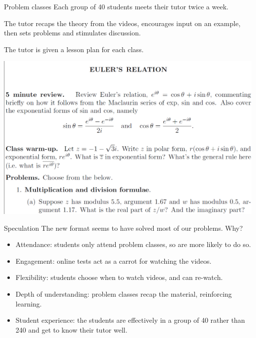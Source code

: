 \documentclass[12pt,envcountsect]{beamer}
\theoremstyle{plain}
\theoremstyle{definition}
\begin{document}
\begin{frame}{Problem classes}
Each group of 40 students meets their tutor twice a week. \pause

The tutor recaps the theory from the videos, \pause encourages input on an example, \pause then sets problems and stimulates discussion.\pause

The tutor is given a lesson plan for each class.
\end{frame}

\begin{frame}
\includegraphics[width=1\textwidth]{worksheet.jpg}
\end{frame}

\begin{frame}{Speculation}
The new format seems to have solved most of our problems. \pause Why?\pause
\begin{itemize}
\item Attendance: students only attend problem classes, so are more likely to do so.\pause
\item Engagement: online tests act as a carrot for watching the videos.\pause
\item Flexibility: students choose when to watch videos, and can re-watch.\pause
\item Depth of understanding: problem classes recap the material, reinforcing learning.\pause
\item Student experience: the students are effectively in a group of 40 rather than 240 and get to know their tutor well.
\end{itemize}
\end{frame}
\end{document}
